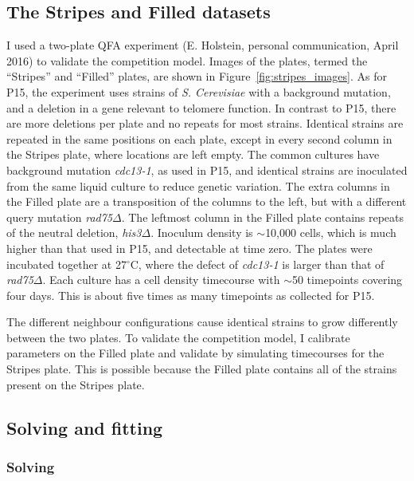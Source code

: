 \subsection{The Stripes and Filled datasets}
\label{sec:stripes_description}

I used a two-plate QFA experiment (E. Holstein, personal
communication, April 2016) to validate the competition model. Images
of the plates, termed the ``Stripes'' and ``Filled'' plates, are shown
in Figure~\ref{fig:stripes_images}. As for P15, the experiment uses
strains of \textit{S. Cerevisiae} with a background mutation, and a
deletion in a gene relevant to telomere function. In contrast to P15,
there are more deletions per plate and no repeats for most
strains. Identical strains are repeated in the same positions on each
plate, except in every second column in the Stripes plate, where
locations are left empty. The common cultures have background mutation
\textit{cdc13-1}, as used in P15, and identical strains are inoculated
from the same liquid culture to reduce genetic variation. The extra
columns in the Filled plate are a transposition of the columns to the
left, but with a different query mutation
\textit{rad75}\(\Delta\). The leftmost column in the Filled plate
contains repeats of the neutral deletion,
\textit{his3}\(\Delta\). Inoculum density is \(\sim\)10,000 cells,
which is much higher than that used in P15, and detectable at time
zero. The plates were incubated together at 27\(^{\circ}\)C, where the
defect of \textit{cdc13-1} is larger than that of
\textit{rad75}\(\Delta\).  Each culture has a cell density timecourse
with \(\sim\)50 timepoints covering four days. This is about five
times as many timepoints as collected for P15.

The different neighbour configurations cause identical strains to grow
differently between the two plates. To validate the competition model,
I calibrate parameters on the Filled plate and validate by simulating
timecourses for the Stripes plate. This is possible because the Filled
plate contains all of the strains present on the Stripes plate.

\subsection{Solving and fitting}

\subsubsection{Solving}
\label{sec:solving_comp}

